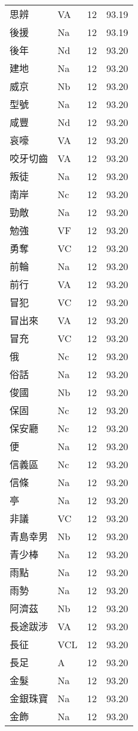 \documentclass[twocolumn]{book}
\begin{document}
\begin{supertabular}{llrr}
思辨 & VA & 12 &  93.19\\
後援 & Na & 12 &  93.19\\
後年 & Nd & 12 &  93.20\\
建地 & Na & 12 &  93.20\\
威京 & Nb & 12 &  93.20\\
型號 & Na & 12 &  93.20\\
咸豐 & Nd & 12 &  93.20\\
哀嚎 & VA & 12 &  93.20\\
咬牙切齒 & VA & 12 &  93.20\\
叛徒 & Na & 12 &  93.20\\
南岸 & Nc & 12 &  93.20\\
勁敵 & Na & 12 &  93.20\\
勉強 & VF & 12 &  93.20\\
勇奪 & VC & 12 &  93.20\\
前輪 & Na & 12 &  93.20\\
前行 & VA & 12 &  93.20\\
冒犯 & VC & 12 &  93.20\\
冒出來 & VA & 12 &  93.20\\
冒充 & VC & 12 &  93.20\\
俄 & Nc & 12 &  93.20\\
俗話 & Na & 12 &  93.20\\
俊國 & Nb & 12 &  93.20\\
保固 & Nc & 12 &  93.20\\
保安廳 & Nc & 12 &  93.20\\
便 & Na & 12 &  93.20\\
信義區 & Nc & 12 &  93.20\\
信條 & Na & 12 &  93.20\\
亭 & Na & 12 &  93.20\\
非議 & VC & 12 &  93.20\\
青島幸男 & Nb & 12 &  93.20\\
青少棒 & Na & 12 &  93.20\\
雨點 & Na & 12 &  93.20\\
雨勢 & Na & 12 &  93.20\\
阿濟茲 & Nb & 12 &  93.20\\
長途跋涉 & VA & 12 &  93.20\\
長征 & VCL & 12 &  93.20\\
長足 & A & 12 &  93.20\\
金髮 & Na & 12 &  93.20\\
金銀珠寶 & Na & 12 &  93.20\\
金飾 & Na & 12 &  93.20\\

\end{supertabular}
\end{document}
